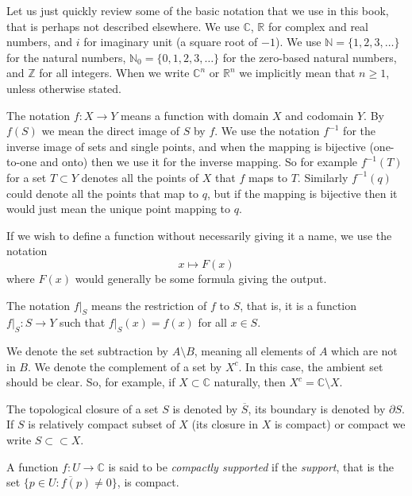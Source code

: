 \documentclass[12pt,openany]{book}
\newcommand{\C}{{\mathbb{C}}}
\newcommand{\R}{{\mathbb{R}}}
\newcommand{\Z}{{\mathbb{Z}}}
\newcommand{\N}{{\mathbb{N}}}
\newcommand{\myindex}[1]{#1\index{#1}}
\theoremstyle{plain}
\theoremstyle{remark}
\theoremstyle{definition}
\theoremstyle{exercise}
\theoremstyle{example}
\begin{document}



Let us just quickly review some of the basic notation that we use in this
book, that is perhaps not described elsewhere.
We use $\C$, $\R$ for complex and real numbers, and $i$ for imaginary unit
(a square root of $-1$).  We use
$\N = \{ 1,2,3, \ldots \}$ for 
the natural numbers, 
$\N_0 = \{ 0,1,2,3, \ldots \}$ for the zero-based natural numbers,
and $\Z$ for all integers.
When we write $\C^n$ or $\R^n$ we implicitly mean that $n \geq 1$, unless
otherwise stated.

The notation $f \colon X \to Y$ means a function with domain $X$ and
codomain $Y$.  By $f(S)$ we mean the direct image of $S$ by $f$.
We use the notation $f^{-1}$ for the inverse image of sets and
single points, and when the mapping is bijective (one-to-one and onto)
then we use it for the inverse mapping.  So for example $f^{-1}(T)$ for
a set $T \subset Y$ denotes all the points of $X$ that $f$ maps to $T$.
Similarly $f^{-1}(q)$ could denote all the points that map to $q$,
but if the mapping is bijective then it would just mean the unique point
mapping to $q$.

If we wish to define a function without necessarily giving it a name, we use
the notation
\begin{equation*}
x \mapsto F(x)
\end{equation*}
where $F(x)$ would generally be some formula giving the output.

The notation $f|_S$ means the restriction of $f$ to $S$, that is,
it is a function
$f|_S \colon S \to Y$ such that $f|_S(x) = f(x)$ for all $x \in S$.

We denote the set subtraction by $A \setminus B$, meaning all elements of
$A$ which are not in $B$.
We denote the complement of a set by $X^c$.  In this case, the ambient set
should be clear.  So, for example, if $X \subset \C$ naturally,
then $X^c = \C \setminus X$.

The topological closure of a set $S$ is denoted by $\overline{S}$, its
boundary is denoted by
%
$\partial S$.  If $S$ is relatively compact subset of $X$
(its closure in $X$ is compact) or compact we write $S \subset \subset X$.

A function $f \colon U \to \C$ is said to be \emph{\myindex{compactly
supported}} if
the \emph{\myindex{support}}, that is the set
$\overline{\{ p \in U : f(p) \not= 0 \}}$, is compact.
\end{document}
